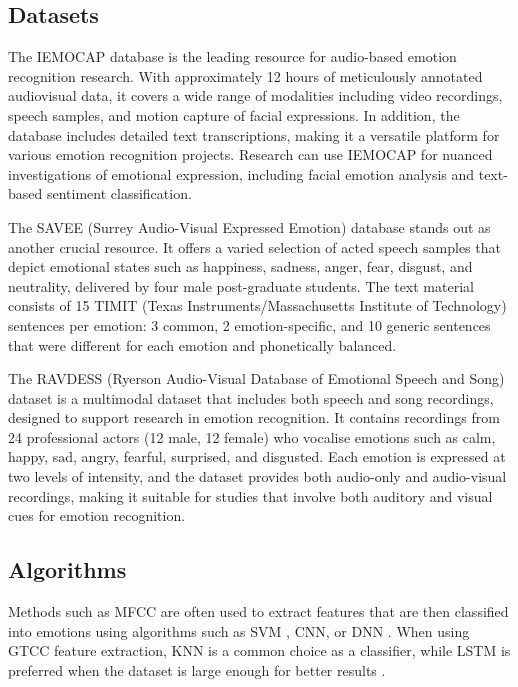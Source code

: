 \subsection{Datasets}

The IEMOCAP database \cite{Busso2008-qj} is the leading resource for audio-based emotion recognition research. With approximately 12 hours of meticulously annotated audiovisual data, it covers a wide range of modalities including video recordings, speech samples, and motion capture of facial expressions. In addition, the database includes detailed text transcriptions, making it a versatile platform for various emotion recognition projects. Research can use IEMOCAP for nuanced investigations of emotional expression, including facial emotion analysis and text-based sentiment classification.

The SAVEE (Surrey Audio-Visual Expressed Emotion) database \cite{HaqJackson_AVSP09} stands out as another crucial resource. It offers a varied selection of acted speech samples that depict emotional states such as happiness, sadness, anger, fear, disgust, and neutrality, delivered by four male post-graduate students. The text material consists of 15 TIMIT (Texas Instruments/Massachusetts Institute of Technology) sentences per emotion: 3 common, 2 emotion-specific, and 10 generic sentences that were different for each emotion and phonetically balanced.

The RAVDESS (Ryerson Audio-Visual Database of Emotional Speech and Song) dataset \cite{Livingstone2018-li} is a multimodal dataset that includes both speech and song recordings, designed to support research in emotion recognition. It contains recordings from 24 professional actors (12 male, 12 female) who vocalise emotions such as calm, happy, sad, angry, fearful, surprised, and disgusted. Each emotion is expressed at two levels of intensity, and the dataset provides both audio-only and audio-visual recordings, making it suitable for studies that involve both auditory and visual cues for emotion recognition.

\subsection{Algorithms}

Methods such as MFCC are often used to extract features that are then classified into emotions using algorithms such as SVM \cite{Khan2023-nz}, CNN, or DNN \cite{Shanta2021-af} \cite{Qayyum2019-bt}. When using GTCC feature extraction, KNN is a common choice as a classifier, while LSTM is preferred when the dataset is large enough for better results \cite{Zhu2019-iq}.


